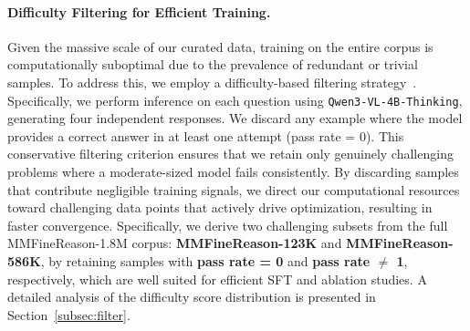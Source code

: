 \paragraph{Difficulty Filtering for Efficient Training.}\label{para:difficulty}
Given the massive scale of our curated data, training on the entire corpus is computationally suboptimal due to the prevalence of redundant or trivial samples. To address this, we employ a difficulty-based filtering strategy~\cite{limo}. Specifically, we perform inference on each question using \texttt{Qwen3-VL-4B-Thinking}, generating four independent responses. We discard any example where the model provides a correct answer in at least one attempt (pass rate = 0). This conservative filtering criterion ensures that we retain only genuinely challenging problems where a moderate-sized model fails consistently. By discarding samples that contribute negligible training signals, we direct our computational resources toward challenging data points that actively drive optimization, resulting in faster convergence. 
Specifically, we derive two challenging subsets from the full MMFineReason-1.8M corpus: \textbf{MMFineReason-123K} and \textbf{MMFineReason-586K}, by retaining samples with \textbf{pass rate = 0} and \textbf{pass rate $\neq$ 1}, respectively, which are well suited for efficient SFT and ablation studies.
A detailed analysis of the difficulty score distribution is presented in Section~\ref{subsec:filter}.






